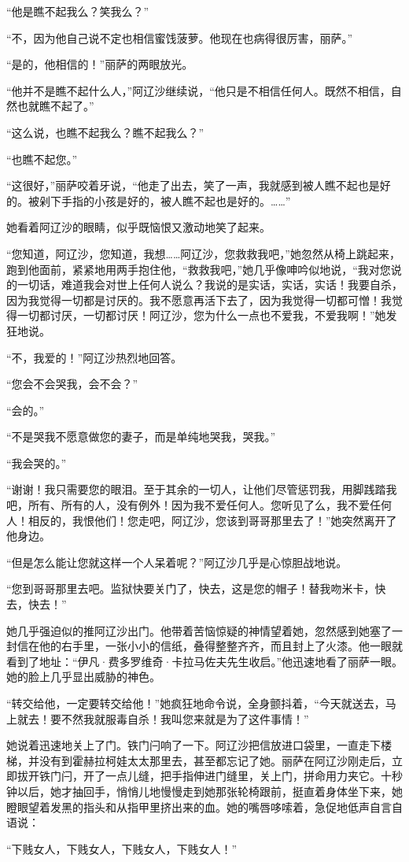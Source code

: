\par “他是瞧不起我么？笑我么？”
\par “不，因为他自己说不定也相信蜜饯菠萝。他现在也病得很厉害，丽萨。”
\par “是的，他相信的！”丽萨的两眼放光。
\par “他并不是瞧不起什么人，”阿辽沙继续说，“他只是不相信任何人。既然不相信，自然也就瞧不起了。”
\par “这么说，也瞧不起我么？瞧不起我么？”
\par “也瞧不起您。”
\par “这很好，”丽萨咬着牙说，“他走了出去，笑了一声，我就感到被人瞧不起也是好的。被剁下手指的小孩是好的，被人瞧不起也是好的。……”
\par 她看着阿辽沙的眼睛，似乎既恼恨又激动地笑了起来。
\par “您知道，阿辽沙，您知道，我想……阿辽沙，您救救我吧，”她忽然从椅上跳起来，跑到他面前，紧紧地用两手抱住他，“救救我吧，”她几乎像呻吟似地说，“我对您说的一切话，难道我会对世上任何人说么？我说的是实话，实话，实话！我要自杀，因为我觉得一切都是讨厌的。我不愿意再活下去了，因为我觉得一切都可憎！我觉得一切都讨厌，一切都讨厌！阿辽沙，您为什么一点也不爱我，不爱我啊！”她发狂地说。
\par “不，我爱的！”阿辽沙热烈地回答。
\par “您会不会哭我，会不会？”
\par “会的。”
\par “不是哭我不愿意做您的妻子，而是单纯地哭我，哭我。”
\par “我会哭的。”
\par “谢谢！我只需要您的眼泪。至于其余的一切人，让他们尽管惩罚我，用脚践踏我吧，所有、所有的人，没有例外！因为我不爱任何人。您听见了么，我不爱任何人！相反的，我恨他们！您走吧，阿辽沙，您该到哥哥那里去了！”她突然离开了他身边。
\par “但是怎么能让您就这样一个人呆着呢？”阿辽沙几乎是心惊胆战地说。
\par “您到哥哥那里去吧。监狱快要关门了，快去，这是您的帽子！替我吻米卡，快去，快去！”
\par 她几乎强迫似的推阿辽沙出门。他带着苦恼惊疑的神情望着她，忽然感到她塞了一封信在他的右手里，一张小小的信纸，叠得整整齐齐，而且封上了火漆。他一眼就看到了地址：“伊凡·费多罗维奇·卡拉马佐夫先生收启。”他迅速地看了丽萨一眼。她的脸上几乎显出威胁的神色。
\par “转交给他，一定要转交给他！”她疯狂地命令说，全身颤抖着，“今天就送去，马上就去！要不然我就服毒自杀！我叫您来就是为了这件事情！”
\par 她说着迅速地关上了门。铁门闩响了一下。阿辽沙把信放进口袋里，一直走下楼梯，并没有到霍赫拉柯娃太太那里去，甚至都忘记了她。丽萨在阿辽沙刚走后，立即拔开铁门闩，开了一点儿缝，把手指伸进门缝里，关上门，拼命用力夹它。十秒钟以后，她才抽回手，悄悄儿地慢慢走到她那张轮椅跟前，挺直着身体坐下来，她瞪眼望着发黑的指头和从指甲里挤出来的血。她的嘴唇哆嗦着，急促地低声自言自语说：
\par “下贱女人，下贱女人，下贱女人，下贱女人！”
